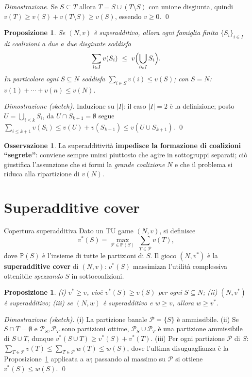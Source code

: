 \documentclass[12pt,a4paper,twoside]{book}
\theoremstyle{plain}
\newtheorem{proposition}[theorem]{Proposizione}
\theoremstyle{definition}
\newtheorem{remark}[theorem]{Osservazione}
\begin{document}
\textit{Dimostrazione.} Se $S\subseteq T$ allora $T=S\cup(T\setminus S)$ con unione disgiunta, quindi $v(T)\ge v(S)+v(T\setminus S)\ge v(S)$, essendo $v\ge0$. \qed

\begin{proposition}
\label{prop:superadd-fam}
Se $(N,v)$ è superadditivo, allora ogni famiglia finita $\{S_i\}_{i\in I}$ di coalizioni a due a due disgiunte soddisfa
\[ \sum_{i\in I}v(S_i)\ \le\ v\Bigl(\bigcup_{i\in I}S_i\Bigr). \]
In particolare ogni $S\subseteq N$ soddisfa $\sum_{i\in S}v(i)\le v(S)$; con $S=N$: $v(1)+\cdots+v(n)\le v(N)$.
\end{proposition}

\textit{Dimostrazione (sketch).} Induzione su $|I|$: il caso $|I|=2$ è la definizione; posto $U=\bigcup_{i\le k}S_i$, da $U\cap S_{k+1}=\emptyset$ segue $\sum_{i\le k+1}v(S_i)\le v(U)+v(S_{k+1})\le v(U\cup S_{k+1})$. \qed

\begin{remark}
La superadditività \textbf{impedisce la formazione di coalizioni ``segrete''}: conviene sempre unirsi piuttosto che agire in sottogruppi separati; ciò giustifica l'assunzione che si formi la \emph{grande coalizione} $N$ e che il problema si riduca alla ripartizione di $v(N)$.
\end{remark}

\section{Superadditive cover}

\begin{defbox}{Copertura superadditiva}
Dato un TU game $(N,v)$, si definisce
\[ v^*(S)=\max_{\mathcal P\in\mathbb P(S)}\ \sum_{T\in\mathcal P}v(T), \]
dove $\mathbb P(S)$ è l'insieme di tutte le partizioni di $S$. Il gioco $(N,v^*)$ è la \textbf{superadditive cover} di $(N,v)$: $v^*(S)$ massimizza l'utilità complessiva ottenibile \emph{spezzando} $S$ in sottocoalizioni.
\end{defbox}

\begin{proposition}
(i) $v^*\ge v$, cioè $v^*(S)\ge v(S)$ per ogni $S\subseteq N$;\quad
(ii) $(N,v^*)$ è superadditivo;\quad
(iii) se $(N,w)$ è superadditivo e $w\ge v$, allora $w\ge v^*$.
\end{proposition}

\textit{Dimostrazione (sketch).} (i) La partizione banale $\mathcal P=\{S\}$ è ammissibile. (ii) Se $S\cap T=\emptyset$ e $\mathcal P_S,\mathcal P_T$ sono partizioni ottime, $\mathcal P_S\cup\mathcal P_T$ è una partizione ammissibile di $S\cup T$, dunque $v^*(S\cup T)\ge v^*(S)+v^*(T)$. (iii) Per ogni partizione $\mathcal P$ di $S$: $\sum_{T\in\mathcal P}v(T)\le\sum_{T\in\mathcal P}w(T)\le w(S)$, dove l'ultima disuguaglianza è la Proposizione~\ref{prop:superadd-fam} applicata a $w$; passando al massimo su $\mathcal P$ si ottiene $v^*(S)\le w(S)$. \qed
\end{document}
